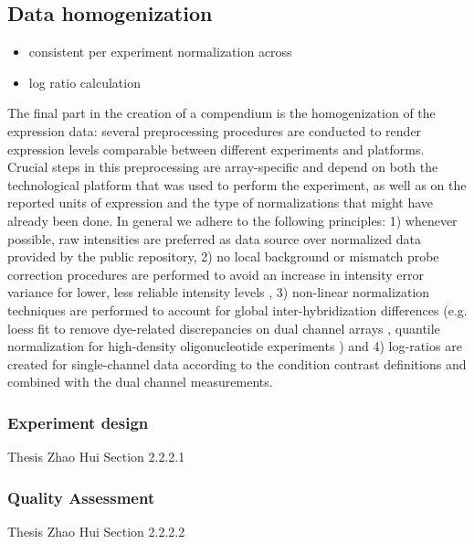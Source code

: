 \subsection{Data homogenization}

\begin{itemize}
\item consistent per experiment normalization across
\item log ratio calculation
\end{itemize}



The final part in the creation of a compendium is the homogenization of the 
expression data: several preprocessing procedures are conducted to render 
expression levels comparable between different experiments and platforms. 
Crucial steps in this preprocessing are array-specific and depend on both the 
technological platform that was used to perform the experiment, as well as on 
the reported units of expression and the type of normalizations that might have 
already been done. In general we adhere to the following principles: 1) 
whenever possible, raw intensities are preferred as data source over normalized 
data provided by the public repository, 2) no local background or mismatch 
probe correction procedures are performed to avoid an increase in intensity 
error variance for lower, less reliable intensity levels 
\cite{Ritchie2007,Engelen2006,Li2001}, 3) non-linear normalization techniques 
are performed to account for global inter-hybridization differences (e.g. loess 
fit to remove dye-related discrepancies on dual channel arrays \cite{Yang2002}, 
quantile normalization for high-density oligonucleotide experiments 
\cite{Bolstad2003}) and 4) log-ratios are created for single-channel data 
according to the condition contrast definitions and combined with the dual 
channel measurements.


\subsubsection{Experiment design}

Thesis Zhao Hui Section 2.2.2.1

\subsubsection{Quality Assessment}

Thesis Zhao Hui Section 2.2.2.2





